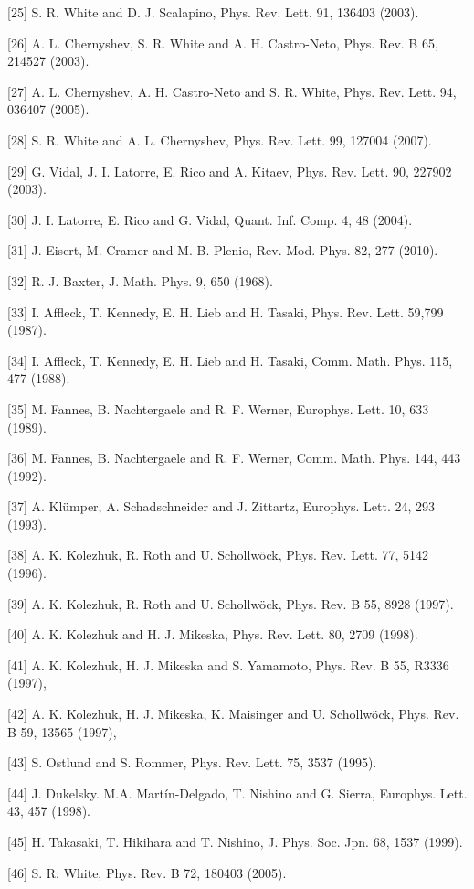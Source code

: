 \documentclass[12pt]{article}
\begin{document}
[25] S. R. White and D. J. Scalapino, Phys. Rev. Lett. 91, 136403 (2003).

[26] A. L. Chernyshev, S. R. White and A. H. Castro-Neto, Phys. Rev. B 65, 214527 (2003).

[27] A. L. Chernyshev, A. H. Castro-Neto and S. R. White, Phys. Rev. Lett. 94, 036407 (2005).

[28] S. R. White and A. L. Chernyshev, Phys. Rev. Lett. 99, 127004 (2007).

[29] G. Vidal, J. I. Latorre, E. Rico and A. Kitaev, Phys. Rev. Lett. 90, 227902 (2003).

[30] J. I. Latorre, E. Rico and G. Vidal, Quant. Inf. Comp. 4, 48 (2004).

[31] J. Eisert, M. Cramer and M. B. Plenio, Rev. Mod. Phys. 82, 277 (2010).

[32] R. J. Baxter, J. Math. Phys. 9, 650 (1968).

[33] I. Affleck, T. Kennedy, E. H. Lieb and H. Tasaki, Phys. Rev. Lett. 59,799 (1987).

[34] I. Affleck, T. Kennedy, E. H. Lieb and H. Tasaki, Comm. Math. Phys. 115, 477 (1988).

[35] M. Fannes, B. Nachtergaele and R. F. Werner, Europhys. Lett. 10, 633 (1989).

[36] M. Fannes, B. Nachtergaele and R. F. Werner, Comm. Math. Phys. 144, 443 (1992).

[37] A. Klümper, A. Schadschneider and J. Zittartz, Europhys. Lett. 24, 293 (1993).

[38] A. K. Kolezhuk, R. Roth and U. Schollwöck, Phys. Rev. Lett. 77, 5142 (1996).

[39] A. K. Kolezhuk, R. Roth and U. Schollwöck, Phys. Rev. B 55, 8928 (1997).

[40] A. K. Kolezhuk and H. J. Mikeska, Phys. Rev. Lett. 80, 2709 (1998).

[41] A. K. Kolezhuk, H. J. Mikeska and S. Yamamoto, Phys. Rev. B 55, R3336 (1997),

[42] A. K. Kolezhuk, H. J. Mikeska, K. Maisinger and U. Schollwöck, Phys. Rev. B 59, 13565 (1997),

[43] S. Ostlund and S. Rommer, Phys. Rev. Lett. 75, 3537 (1995).

[44] J. Dukelsky. M.A. Martín-Delgado, T. Nishino and G. Sierra, Europhys. Lett. 43, 457 (1998).

[45] H. Takasaki, T. Hikihara and T. Nishino, J. Phys. Soc. Jpn. 68, 1537 (1999).

[46] S. R. White, Phys. Rev. B 72, 180403 (2005).
\end{document}
